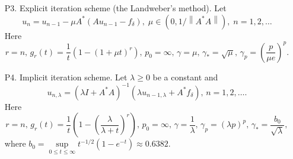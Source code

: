 \documentclass[10pt]{article}
\theoremstyle{definition}
\theoremstyle{remark}
\theoremstyle{plain}
\newcommand{\wt}{\widetilde}
\begin{document}
\begin{itemize}
\item[P3.] 
Explicit iteration scheme (the Landweber’s method). Let 
$$
u_n = u_{n-1} -\mu A^*(Au_{n-1} - f_\delta),\;
\mu\in \left(0,1/\left\|A^*A\right\| \right), \;
n = 1,2,\ldots
$$
Here 
$$
r=n, \, 
g_r(t) = \frac{1}{t}\left(1-(1+\mu t)^r\right), \,
p_0=\infty, \,
\gamma = \mu, \,
\gamma_* = \sqrt{\mu}, \,
\gamma_p = \left(\frac{p}{\mu e}\right)^p.
$$
\item[P4.] Implicit iteration scheme. Let $\lambda\geqslant 0 $ be a constant and  
$$
u_{n,\lambda} = 
	\left(\lambda I + A^*A\right)^{-1} 
	\left(\lambda u_{n-1,\lambda}+ A^*f_\delta\right),
\,
n = 1,2,\ldots.
$$
Here
$$
r=n, \, 
g_r(t) = \frac{1}{t}\left(1-\left(\frac{\lambda}{\lambda+t}\right)^r\right), \,
p_0=\infty, \,
\gamma = \frac{1}{\lambda}, \,
\gamma_p = (\lambda p)^p, \,
\gamma_* = \frac{b_0}{\sqrt{\lambda}},
$$ 
where 
$
b_0 = \sup\limits_{0\leqslant t \leqslant \infty} 
	t^{-1/2}\left(1-e^{-t}\right)
	\approx 0.6382.
$


\end{itemize}
\end{document}
